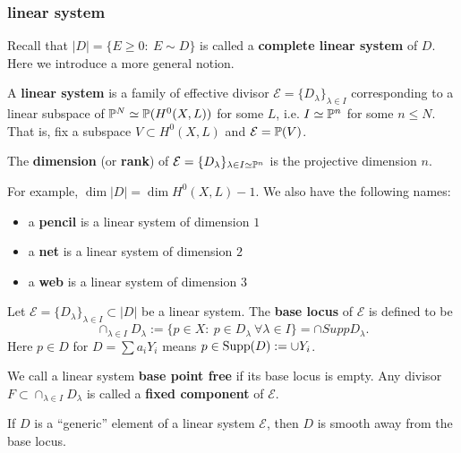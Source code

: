 \subsubsection{linear system}

Recall that $|D|=\{E\geq 0:\ E\sim D\}$ is called a \textbf{complete linear system} of $D$. Here we introduce a more general notion.

\begin{definition}
A \textbf{linear system} is a family of effective divisor $\mathcal{E}=\{D_\lambda\}_{\lambda\in I}$ corresponding to a linear subspace of ${\mathbb P}^N\simeq {\mathbb P}(H^0(X,L))$ for some $L$, i.e. $I\simeq {\mathbb P}^n$ for some $n\leq N$. That is, fix a subspace $V\subset H^0(X,L)$ and $\mathcal{E}={\mathbb P}(V)$.
\end{definition}

\begin{definition}
The \textbf{dimension} (or \textbf{rank}) of $\mathcal{E}=\{D_\lambda\}_{\lambda\in I\simeq {\mathbb P}^n}$ is the projective dimension $n$.
\end{definition}

For example, $\dim|D|=\dim H^0(X,L)-1$. We also have the following names:
\begin{itemize}
\item a \textbf{pencil} is a linear system of dimension $1$
\item a \textbf{net} is a linear system of dimension $2$
\item a \textbf{web} is a linear system of dimension $3$
\end{itemize}

\begin{definition}
Let $\mathcal{E}=\{D_\lambda\}_{\lambda\in I}\subset |D|$ be a linear system. The \textbf{base locus} of $\mathcal{E}$ is defined to be
$$\cap_{\lambda\in I} D_\lambda :=\{p \in X:\ p \in D_\lambda\ \forall \lambda\in I\}=\cap Supp D_\lambda.$$ 
Here $p \in D$ for $D=\sum{a_i Y_i}$ means $p \in {\rm Supp}(D) := \cup Y_i$.

We call a linear system \textbf{base point free} if its base locus is empty.
Any divisor $F\subset \cap_{\lambda\in I} D_\lambda$ is called a \textbf{fixed component} of $\mathcal{E}$.
\end{definition}

\begin{theorem}[Bertini]
If $D$ is a ``generic'' element of a linear system $\mathcal{E}$, then $D$ is smooth away from the base locus.
\end{theorem}

